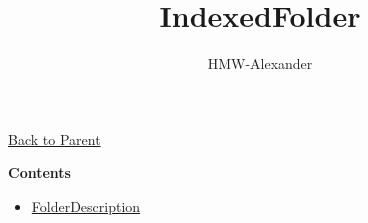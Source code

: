 \documentclass[letterpaper,11pt]{article}
\title{\textbf{IndexedFolder}}
\author{HMW-Alexander}
\begin{document}
\maketitle

\href{../index.html}{Back to Parent}

\textbf{Contents}
\begin{itemize}
	\item \href{./FolderName/index.html}{FolderDescription}
\end{itemize}
	
\end{document}
